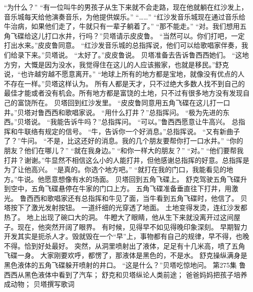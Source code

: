 \documentclass[a4paper,12pt,UTF8,twoside]{ctexbook}
\begin{document}
        “为什么？”  
        “有一位叫牛的男孩子从生下来就不会走路，现在他就躺在红沙发上，音乐城每天给他演奏音乐，为他提供娱乐。”  
        “……”  
        “红沙发音乐城现在通过音乐给牛治病，如果他们走了，牛就只有一辈子躺着了。”  
        “那不能走。”  
        “对。我们想用五角飞碟给这儿打口水井，行吗？”贝塔请示皮皮鲁。  
        “当然可以。你们打吧，一定打出水来。”皮皮鲁同意。  
        “红沙发音乐城的总指挥说，他们可以给歌唱家伴奏，我们给录下来。”贝塔说。  
        “太好了。”皮皮鲁说。  
        贝塔准备去告诉鲁西西她们。  
        “这地方穷，大慨是因为没水，我觉得住在这儿的人应该搬家，也就是移民。”舒克说，“也许越穷越不愿意离开。”  
        “地球上所有的地方都是宝地，就像没有优点的人不存在一样。”贝塔这样认为。  
        所有人都是天才，只不过绝大多数人找不到自己的最佳才能或者没有机会。所有地方都是富饶的土地，只不过有很多地方没有发现自己的富饶所在。  
        贝塔回到红沙发里。  
        “皮皮鲁同意用五角飞碟在这儿打一口井。”贝塔对鲁西西和歌唱家说。  
        “用什么打井？”总指挥问。  
        “极为先进的东西。”贝塔说。  
        “我能告诉牛吗？”总指挥问。  
        “可以。”鲁西西愿意让牛高兴。  
        总指挥和牛联络有规定的信号。  
        “牛，告诉你一个好消息。”总指挥说。  
        “又有新曲子了？”牛问。  
        “不是，比这还好的消息。我的几个朋友要帮你打一口水井。”  
        “你的朋友？他们在哪儿？”  
        “就在我身边。”  
        “和你一样大的朋友？”  
        “对。”  
        “他们要帮我打井？谢谢。”牛显然不相信这么小的人能打井，但他感谢总指挥的好意。总指挥是为了让他高兴。  
        “是真的。你选个地方吧。”  
        “就打在我的门口，我能看见的地方。”牛说。他愿意想像有水的场面。  
        贝塔回到五角飞碟上。  
        舒克驾驶五角飞碟升到空中，五角飞碟悬停在牛家的门口上方。  
        五角飞碟准备垂直往下打井，用激光。  
        鲁西西和歌唱家还有总指挥和牛见了面，当牛看到五角飞碟时，他信了。  
        贝塔按下了激光发射按钮。  
        一道纤细的光穿透了地面。  
        土地变得发烫，连红沙发都热了。  
        地上出现了碗口大的洞。  
        牛瞪大了眼睛，他从生下来就没离开过这间屋子。现在，他突然开阔了眼界。  
        有时候，见得早不如见得晚印象深刻。  
        早期智力开发其实是扼杀人才。毁就毁在一个“早”上，事物都有自己的规律，早不得，也晚不得。恰到好处最好。  
        突然，从洞里喷射出了液体，足足有十几米高，喷了五角飞碟一身。  
        大家刚要欢呼，都愣了，那液体是黑色的，不是水。        
        舒克操纵满身是黑色液体的五角飞碟躲开喷射的井口。  
        “这是什么？”贝塔吃惊地问。          第275集  
        鲁西西从黑色液体中看到了汽车；  
        舒克和贝塔纵论人类前途；  
        爸爸妈妈把孩子培养成动物；  
        贝塔撰写歌词   
\end{document}
